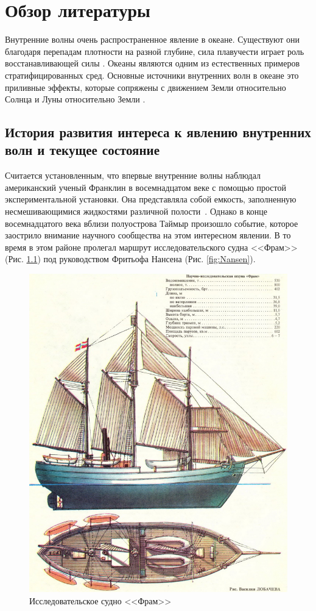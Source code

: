 \chapter{Обзор литературы}

Внутренние волны очень распространенное явление в океане\cite{holton_encyclopedia_2003}. Существуют они благодаря перепадам плотности на разной глубине, сила плавучести играет роль восстанавливающей силы \cite{Eckart1961}. Океаны являются одним из естественных примеров стратифицированных сред. Основные источники внутренних волн в океане это приливные эффекты, которые сопряжены с движением Земли относительно Солнца и Луны относительно Земли \cite{Egbert2000}.

\section{История развития интереса к явлению внутренних волн и текущее состояние}

Считается установленным, что впервые внутренние волны наблюдал американский ученый Франклин в восемнадцатом веке с помощью простой экспериментальной установки. Она представляла собой емкость, заполненную несмешивающимися жидкостями различной полости~\cite{Sudolski}. Однако в конце восемнадцатого века вблизи полуострова Таймыр произошло событие, которое заострило внимание научного сообщества на этом интересном явлении. В то время в этом районе пролегал маршрут исследовательского судна <<Фрам>>(Рис. \ref{fig:fram}) под руководством Фритьофа Нансена (Рис. \ref{fig:Nansen}).

\begin{figure}
    \centering
    \includegraphics[width=1\textwidth]{Figs/FRAM.jpg}
    \caption{Исследовательское судно <<Фрам>>}
    \label{fig:fram}
\end{figure}

